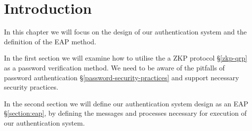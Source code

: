 \section{Introduction}
In this chapter we will focus on the design of our authentication system and the definition of the EAP method.

In the first section we will examine how to utilise the a ZKP protocol \S\ref{zkp-qrp} as a password verification method.
We need to be aware of the pitfalls 	of password authentication \S\ref{password-security-practices} and support necessary security practices.

In the second section we will define our authentication system design as an EAP \S\ref{section:eap}, by defining the messages and processes necessary for execution of our authentication system.
